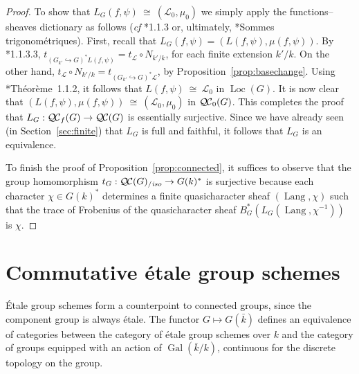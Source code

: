 \documentclass[11pt]{amsart}
\theoremstyle{plain}
\theoremstyle{definition}
\theoremstyle{remark}
\newcommand{\bFq}{\bar{k}}
\newcommand{\Fq}{k}
\DeclareMathOperator{\Gal}{Gal}
\newcommand{\iso}{{\ \cong\ }}
\newcommand{\cs}[1]{{\mathcal{#1}}}
\newcommand{\QC}{{\mathcal{Q\hskip-0.8pt C}}}
\newcommand{\QCb}{{\QC_0}}
\newcommand{\QCf}{{\QC_f}}
\newcommand{\QCiso}[1]{\QC(#1)_{/\textit{iso}}}
\newcommand{\Lang}{{\operatorname{Lang}}}
\newcommand{\Loc}{{\operatorname{Loc}}}
\newcommand{\trFrob}[1]{t_{#1}}
\begin{document}
\begin{proof}
  To show that $L_G(f,\psi) \iso (\cs{L}_0,\mu_0)$ we simply apply the functions--sheaves dictionary
  as follows ({\it cf} \cite{Laumon}*{1.1.3} or, ultimately, \cite{SGA4.5}*{Sommes trigonométriques}).
  First, recall that $L_G(f,\psi) = (L(f,\psi), \mu(f,\psi))$. 
  By  \cite{Laumon}*{1.1.3.3}, $\trFrob{(G_{k'}\hookrightarrow G)^*L(f,\psi)} = \trFrob{\cs{L}} \circ N_{k'/k}$, for each finite extension $k'/k$.
  On the other hand, $\trFrob{\cs{L}} \circ N_{k'/k} = \trFrob{(G_{k'}\hookrightarrow G)^*\cs{L}}$,  by Proposition~\ref{prop:basechange}.
  Using \cite{Laumon}*{Th\'eor\`eme~1.1.2}, it follows that  $L(f,\psi) \iso \cs{L}_0$ in $\Loc(G)$.
  It is now clear that $(L(f,\psi),\mu(f,\psi)) \iso (\cs{L}_0,\mu_0)$ in $\QCb(G)$.
  This completes the proof that $L_G : \QCf(G) \to \QC(G)$ is essentially surjective.
  Since we have already seen (in Section~\ref{sec:finite}) that $L_G$ is full and faithful, 
  it follows that $L_G$ is an equivalence.
  
  To finish the proof of Proposition~\ref{prop:connected}, it suffices to observe that the group homomorphism
  $
  \trFrob{G} : \QCiso{G} \to G(\Fq)^*
  $
  is surjective because each character $\chi \in G(\Fq)^*$ determines a finite quasicharacter sheaf $(\Lang,\chi)$ such that the trace of Frobenius of the quasicharacter sheaf $B_G^* (L_G(\Lang,\chi^{-1}))$ is $\chi$.
\end{proof}

\section{Commutative \'etale group schemes}

%

\'Etale group schemes form a counterpoint to connected groups, since the component group
is always \'etale.  The functor $G \mapsto G(\bFq)$ defines an equivalence of categories
between the category of \'etale group schemes over $\Fq$ and the category of groups equipped
with an action of $\Gal(\bFq/\Fq)$, continuous for the discrete topology on the group.
\end{document}
